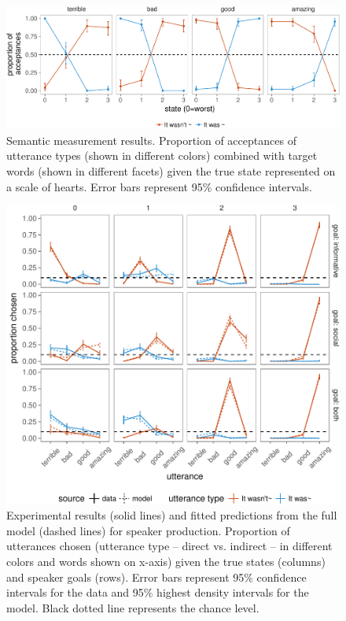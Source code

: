 \documentclass[floatsintext,man]{apa6}
\theoremstyle{definition}
\theoremstyle{definition}
\theoremstyle{definition}
\theoremstyle{remark}
\begin{document}
\begin{figure}[!h]
\includegraphics[width=\textwidth]{polite_manuscript_files/figure-latex/litsem-1} \caption{Semantic measurement results. Proportion of acceptances of utterance types (shown in different colors) combined with target words (shown in different facets) given the true state represented on a scale of hearts. Error bars represent 95\% confidence intervals.}\label{fig:litsem}
\end{figure}

\begin{figure}[!h]
\includegraphics[width=\textwidth]{polite_manuscript_files/figure-latex/utterance-1} \caption{Experimental results (solid lines) and fitted predictions from the full model (dashed lines) for speaker production. Proportion of utterances chosen (utterance type – direct vs. indirect – in different colors and words shown on x-axis) given the true states (columns) and speaker goals (rows). Error bars represent 95\% confidence intervals for the data and 95\% highest density intervals for the model. Black dotted line represents the chance level.}\label{fig:utterance}
\end{figure}
\end{document}

